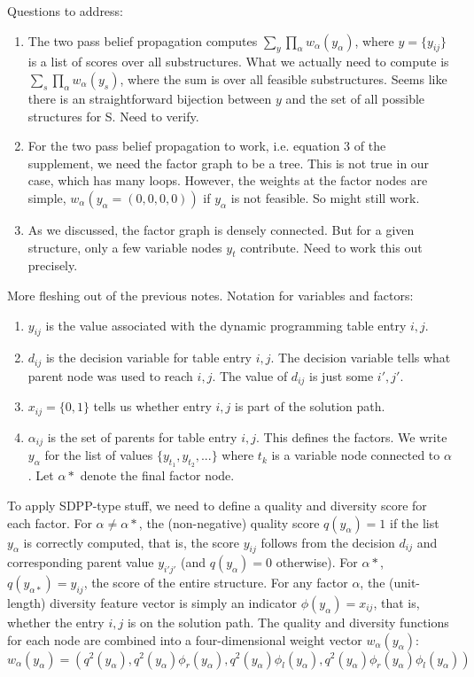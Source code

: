 \documentclass[idxtotoc,hyperref,openany]{labbook} %
\begin{document}
Questions to address:
\begin{enumerate}
\item The two pass belief propagation computes $\sum_{y} \prod_{\alpha} w_{\alpha}(y_{\alpha})$, where $y=\{y_{ij}\}$ is a list of scores over all substructures. What we actually need to compute is $\sum_{s} \prod_{\alpha} w_{\alpha}(y_{s})$, where the sum is over all feasible substructures. Seems like there is an straightforward bijection between $y$ and the set of all possible structures for S. Need to verify.
\item For the two pass belief propagation to work, i.e. equation 3 of the supplement, we need the factor graph to be a tree. This is not true in our case, which has many loops. However, the weights at the factor nodes are simple, $w_{\alpha}(y_{\alpha}=(0, 0, 0, 0))$ if $y_{\alpha}$ is not feasible. So might still work.
\item As we discussed, the factor graph is densely connected. But for a given structure, only a few variable nodes $y_t$ contribute. Need to work this out precisely.
\end{enumerate}


More fleshing out of the previous notes.  Notation for variables and factors:
\begin{enumerate}
\item $y_{ij}$ is the value associated with the dynamic programming
  table entry $i,j$.
\item $d_{ij}$ is the decision variable for table entry $i,j$.  The
  decision variable tells what parent node was used to reach $i,j$.
  The value of $d_{ij}$ is just some $i',j'$.
\item $x_{ij} = \{0,1\}$ tells us whether entry $i,j$ is part of the
  solution path.
\item $\alpha_{ij}$ is the set of parents for table entry $i,j$.  This
  defines the factors.  We write $y_{\alpha}$ for the list of values
  $\{y_{t_1}, y_{t_2}, ...\}$ where $t_k$ is a variable node connected
  to $\alpha$. Let $\alpha*$ denote the final factor node.
\end{enumerate}

To apply SDPP-type stuff, we need to define a quality and diversity
score for each factor. For $\alpha \neq \alpha*$, the (non-negative)
quality score $q(y_{\alpha})=1$ if the list $y_{\alpha}$ is correctly
computed, that is, the score $y_{ij}$ follows from the decision
$d_{ij}$ and corresponding parent value $y_{i'j'}$ (and
$q(y_{\alpha})=0$ otherwise). For $\alpha*$, $q(y_{\alpha*})=y_{ij}$,
the score of the entire structure.  For any factor $\alpha$, the
(unit-length) diversity feature vector is simply an indicator
$\phi(y_{\alpha}) = x_{ij}$, that is, whether the entry $i,j$ is on
the solution path.  The quality and diversity functions for each node
are combined into a four-dimensional weight vector
$w_{\alpha}(y_{\alpha})$:
\[
w_{\alpha}(y_{\alpha})=(q^2(y_{\alpha}), q^2(y_{\alpha})\phi_r(y_{\alpha}), q^2(y_{\alpha})\phi_l(y_{\alpha}), q^2(y_{\alpha})\phi_r(y_{\alpha})\phi_l(y_{\alpha}) )
\]
\end{document}
